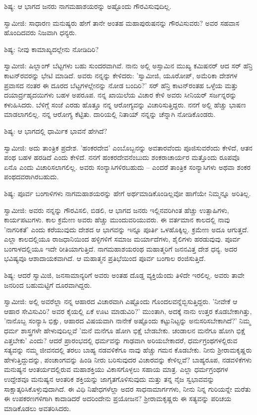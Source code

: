 ಶಿಷ್ಯ: ಆ ಭಾಗದ ಜನರು ನಾಗಮಹಾಶಯರನ್ನು ಅಷ್ಟೊಂದು ಗೌರವಿಸುವುದಿಲ್ಲ.

ಸ್ವಾಮೀಜಿ: ಸಾಧಾರಣ ಮನುಷ್ಯರು ಹೇಗೆ ತಾನೇ ಅಂತಹ ಮಹಾಪುರುಷನನ್ನು ಗೌರವಿಸುವರು? ಅವರ ಸಹವಾಸ ಹೊಂದಿದವರು ನಿಜವಾಗಿ ಧನ್ಯರು.

ಶಿಷ್ಯ: ನೀವು ಕಾಮಾಖ್ಯದಲ್ಲೇನು ನೋಡಿದಿರಿ?

ಸ್ವಾಮೀಜಿ: ಷಿಲ್ಲಾಂಗ್ ಬೆಟ್ಟಗಳು ಬಹು ಸುಂದರವಾಗಿವೆ. ನಾನು ಅಲ್ಲಿ ಅಸ್ಸಾಮಿನ ಮುಖ್ಯ ಕಮಿಷನರ್ ಆದ ಸರ್ ಹೆನ್ರಿ ಕಾಟನ್‌ರವರನ್ನು ಭೇಟಿ ಮಾಡಿದೆ. ಅವರು ನನ್ನನ್ನು ಕೇಳಿದರು: 'ಸ್ವಾಮೀಜಿ, ಯೂರೋಪ್, ಅಮೆರಿಕಾ ದೇಶಗಳ ಪ್ರವಾಸದ ನಂತರ ಈ ದೂರದ ಬೆಟ್ಟಗಳಲ್ಲೇನನ್ನು ನೋಡ ಬಂದಿರಿ?' ಸರ್ ಹೆನ್ರಿ ಕಾಟನ್‌ರಂತಹ ಒಳ್ಳೆಯ ಮತ್ತು ದಯಾರ್ದ್ರಹೃದಯಿಗಳು ಬಹಳ ಅಪರೂಪ. ನನ್ನ ಖಾಯಿಲೆಯ ವಿಚಾರ ಕೇಳಿ ಅವರು ಸೀನಿಯರ್ ಸರ್ಜನ್ನರನ್ನು ಕಳುಹಿಸಿದರು. ಬೆಳಿಗ್ಗೆ ಸಂಜೆ ಎರಡು ಹೊತ್ತೂ ನನ್ನ ಆರೋಗ್ಯವನ್ನು ವಿಚಾರಿಸುತ್ತಿದ್ದರು. ನನಗೆ ಅಲ್ಲಿ ಹೆಚ್ಚು ಭಾಷಣ ಮಾಡಲಾಗಲಿಲ್ಲ. ನನ್ನ ಆರೋಗ್ಯ ಕೆಟ್ಟಿತು. ದಾರಿಯಲ್ಲಿ ನಿತಾಯ್ ನನ್ನನ್ನು ಚೆನ್ನಾಗಿ ನೋಡಿಕೊಂಡರು.

ಶಿಷ್ಯ: ಆ ಭಾಗದಲ್ಲಿ ಧಾರ್ಮಿಕ ಭಾವನೆ ಹೇಗಿದೆ?

ಸ್ವಾಮೀಜಿ: ಅದು ತಾಂತ್ರಿಕ ಪ್ರದೇಶ. 'ಹಂಕರದೇವ' ಎಂಬೊಬ್ಬನನ್ನು ಅವತಾರವೆಂದು ಪೂಜಿಸುವರೆಂದು ಕೇಳಿದೆ, ಆತನ ಪಂಥ ಬಹಳ ಹರಡಿದೆ ಎಂದು ಕೇಳಿದೆ. ನನಗೆ ಹಂಕರದೇವನೆಂಬುದು ಶಂಕರಾಚಾರ್ಯರ ಮತ್ತೊಂದು ರೂಪವೊ ಏನೊ ಎಂದು ವಿಚಾರಿಸಲಾಗಲಿಲ್ಲ. ಅವರು ಸಂನ್ಯಾಸಿಗಳಿರಬಹುದು – ಎಂದರೆ ತಾಂತ್ರಿಕ ಸಂನ್ಯಾಸಿಗಳು ಅಥವಾ ಶಂಕರ ಪಂಥದವರಾಗಿರಬಹುದು.

ಶಿಷ್ಯ: ಪೂರ್ವ ಬಂಗಾಳಿಗಳು ನಾಗಮಹಾಶಯರನ್ನು ಹೇಗೆ ಅರ್ಥಮಾಡಿಕೊಂಡಿಲ್ಲವೋ ಹಾಗೆಯೇ ನಿಮ್ಮನ್ನೂ ಅರಿತಿಲ್ಲ.

ಸ್ವಾಮೀಜಿ: ಅವರು ನನ್ನನ್ನು ಗೌರವಿಸಲಿ, ಬಿಡಲಿ, ಆ ಭಾಗದ ಜನರು ಇಲ್ಲಿನವರಿಗಿಂತ ಹೆಚ್ಚು ಉತ್ಸಾಹಿಗಳು, ಕಾರ್ಯಪಟುಗಳು. ಕಾಲ ಕ್ರಮೇಣ ಅವರು ಹೆಚ್ಚು ಮುಂದುವರಿಯುವರು. ಈ ವರ್ತಮಾನ ಕಾಲದಲ್ಲಿ ನಾವು 'ನಾಗರಿಕತೆ' ಎಂದು ಕರೆಯುವುದು ದೇಶದ ಆ ಭಾಗವನ್ನು ಇನ್ನೂ ಪೂರ್ತಿ ಒಳಹೊಕ್ಕಿಲ್ಲ. ಕ್ರಮೇಣ ಅದೂ ಆಗುತ್ತದೆ. ಎಲ್ಲಾ ಕಾಲದಲ್ಲಿಯೂ ರಾಜಧಾನಿಯಿಂದ ಹಳ್ಳಿಗಳಿಗೆ ಸಮಾಜ ಮರ್ಯಾದೆಗಳು, ಶೈಲಿಗಳು ಹರಡುವುವು. ಪೂರ್ವ ಬಂಗಾಳದಲ್ಲಿಯೂ ಇದೇ ರೀತಿಯಾಗುತ್ತಿದೆ. ನಾಗಮಹಾಶಯರಂಥ ಮಹಾತ್ಮರಿಗೆ ಜನನವಿತ್ತ ದೇಶ ಧನ್ಯ. ಅದರ ಭವಿಷ್ಯವೂ ಆಶಾದಾಯಕವಾಗಿದೆ. ಆ ಮಹಾತ್ಮನ ಪ್ರತಿಭೆಯಿಂದ ಪೂರ್ವ ಬಂಗಾಲ ರಂಜಿಸುತ್ತಿದೆ.

ಶಿಷ್ಯ: ಆದರೆ ಸ್ವಾಮಿಜಿ, ಜನಸಾಮಾನ್ಯರಿಗೆ ಅವರು ಅಂತಹ ದೊಡ್ಡ ವ್ಯಕ್ತಿಯೆಂದು ತಿಳಿದೇ ಇರಲಿಲ್ಲ. ಅವರು ತಾವೇ ಜನರಿಂದ ಬಹುಮಟ್ಟಿಗೆ ದೂರವಾಗಿದ್ದರು.

ಸ್ವಾಮೀಜಿ: ಅಲ್ಲಿ ಅವರೆಲ್ಲಾ ನನ್ನ ಆಹಾರದ ವಿಚಾರವಾಗಿ ಎಷ್ಟೊಂದು ಗೊಂದಲವನ್ನೆಬ್ಬಿಸುತ್ತಿದ್ದರು. 'ನೀವೇಕೆ ಆ ಆಹಾರ ಸೇವಿಸುವಿರಿ? ಅವರ ಕೈಯಲ್ಲಿ ಏಕೆ ಊಟ ಮಾಡುವಿರಿ?' ಮುಂತಾಗಿ, ಅದಕ್ಕೆ ನಾನು ಉತ್ತರ ಕೊಡಬೇಕಾಗಿತ್ತು, 'ನಾನೊಬ್ಬ ಸಂನ್ಯಾಸಿ ಭಿಕ್ಷು, ಆಹಾರದ ವಿಷಯವಾಗಿ ನಾನೇಕೆ ಅಷ್ಟೊಂದು ಕಟ್ಟುನಿಟ್ಟನ್ನು ಅನುಸರಿಸಬೇಕಾಗಿದೆ?' ನಿಮ್ಮ ಧರ್ಮ ಶಾಸ್ತ್ರಗಳೇ ಹೇಳುವುದಿಲ್ಲವೆ 'ಮನೆ ಮನೆಗೂ ಹೋಗಿ ಭಿಕ್ಷೆ ಬೇಡಬೇಕು. ಚಂಡಾಲನ ಮನೆಗೂ ಹೋಗಿ ಭಿಕ್ಷೆ ಎತ್ತಬೇಕು' ಎಂದು? ಆದರೆ ಪ್ರಾರಂಭದಲ್ಲಿ ಧರ್ಮವನ್ನು ಗಾಢವಾಗಿ ಅರಿಯಬೇಕಾದರೆ, ಧರ್ಮಗ್ರಂಥಗಳಲ್ಲಿರುವ ಸತ್ಯವನ್ನು ನಮ್ಮ ಜೀವನದಲ್ಲಿ ತರಲು ಬಾಹ್ಯ ನಡವಳಿಕೆಗೂ ನಾವು ಹೆಚ್ಚು ಗಮನ ಕೊಡಬೇಕು. ನೀನು ಶ‍್ರೀರಾಮಕೃಷ್ಣರು ಹೇಳುತ್ತಿದ್ದುದನ್ನು, ಪಂಚಾಂಗವನ್ನು ಹಿಂಡಿ ನೀರು ಬರಿಸುವುದರ ವಿಚಾರವನ್ನು ಕೇಳಿಲ್ಲವೆ? ಬಾಹ್ಯರೂಪ, ನಡವಳಿಕೆಗಳು ಮನುಷ್ಯನ ಆಂತರ್ಯದಲ್ಲಿರುವ ಮಹಾಶಕ್ತಿಯು ವಿಕಾಸಗೊಳ್ಳಲು ಸಹಾಯ ಮಾತ್ರ. ಎಲ್ಲಾ ಧರ್ಮಗ್ರಂಥಗಳ ಉದ್ದೇಶವೂ ಮನುಷ್ಯನ ಆಂತರಿಕ ಶಕ್ತಿಯನ್ನು ಜಾಗೃತಗೊಳಿಸುವುದು ಮತ್ತು ತನ್ನ ನೈಜ ಸ್ವಭಾವವನ್ನು ಸಾಕ್ಷಾತ್ಕರಿಸಿಕೊಳ್ಳುವುದಾಗಿದೆ. ಈ ವಿಧಿ ನಿಷೇಧಗಳೆಲ್ಲಾ ಅದರ ಸಾಧನಾಮಾರ್ಗಗಳು, ನೀನು ನಿನ್ನ ಗುರಿಯನ್ನೇ ಮರೆತು ಈ ಉಪಕರಣಗಳಿಗಾಗಿ ಕಾದಾಡಿದರೆ ಅದರಿಂದೇನು ಪ್ರಯೋಜನ? ಶ‍್ರೀರಾಮಕೃಷ್ಣರು ಈ ಸತ್ಯವನ್ನು ಪರಿಚಯ ಮಾಡಿಕೊಡಲು ಅವತರಿಸಿದರು.

